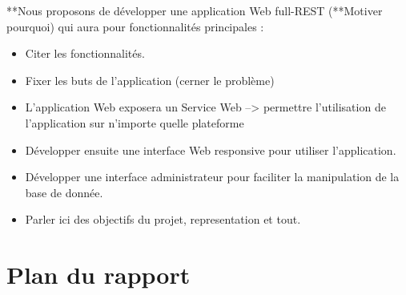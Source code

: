 		
		**Nous proposons de développer une application Web full-REST (**Motiver pourquoi) qui aura pour fonctionnalités principales : 
		\begin{itemize}
		\item Citer les fonctionnalités.
		\item Fixer les buts de l'application (cerner le problème)
		\item L'application Web exposera un Service Web --> permettre l'utilisation de l'application sur n'importe quelle plateforme 
		\item Développer ensuite une interface Web responsive pour utiliser l'application.
		\item Développer une interface administrateur pour faciliter la manipulation de la  base de donnée.
		\item Parler ici des objectifs du projet, representation et tout.
		\end{itemize}
		 
		 
		 \newpage
		 \section{Plan du rapport}